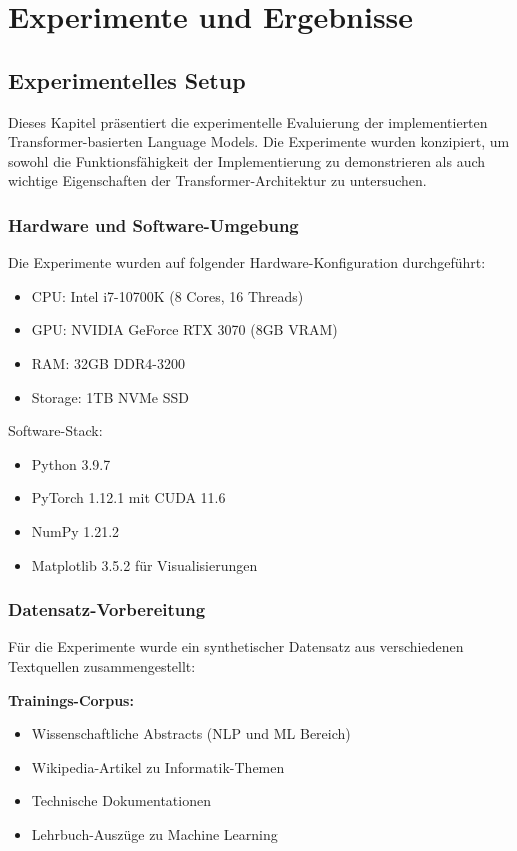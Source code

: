 \chapter{Experimente und Ergebnisse}
\label{ch:experiments}

\section{Experimentelles Setup}

Dieses Kapitel präsentiert die experimentelle Evaluierung der implementierten Transformer-basierten Language Models. Die Experimente wurden konzipiert, um sowohl die Funktionsfähigkeit der Implementierung zu demonstrieren als auch wichtige Eigenschaften der Transformer-Architektur zu untersuchen.

\subsection{Hardware und Software-Umgebung}

Die Experimente wurden auf folgender Hardware-Konfiguration durchgeführt:
\begin{itemize}
    \item CPU: Intel i7-10700K (8 Cores, 16 Threads)
    \item GPU: NVIDIA GeForce RTX 3070 (8GB VRAM)
    \item RAM: 32GB DDR4-3200
    \item Storage: 1TB NVMe SSD
\end{itemize}

Software-Stack:
\begin{itemize}
    \item Python 3.9.7
    \item PyTorch 1.12.1 mit CUDA 11.6
    \item NumPy 1.21.2
    \item Matplotlib 3.5.2 für Visualisierungen
\end{itemize}

\subsection{Datensatz-Vorbereitung}

Für die Experimente wurde ein synthetischer Datensatz aus verschiedenen Textquellen zusammengestellt:

\textbf{Trainings-Corpus:}
\begin{itemize}
    \item Wissenschaftliche Abstracts (NLP und ML Bereich)
    \item Wikipedia-Artikel zu Informatik-Themen
    \item Technische Dokumentationen
    \item Lehrbuch-Auszüge zu Machine Learning
\end{itemize}

